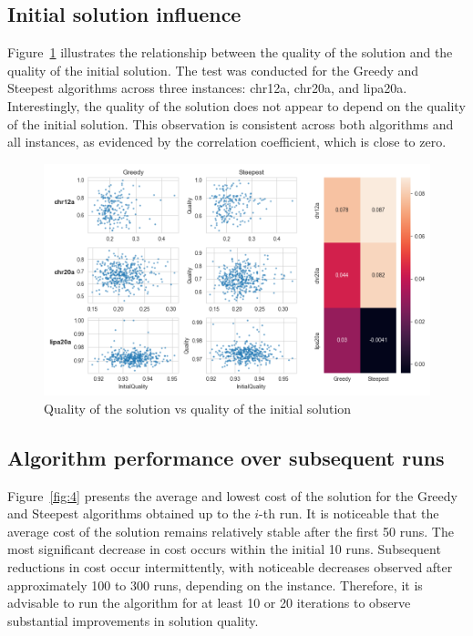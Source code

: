 \subsection{Initial solution influence}\label{subsec:initial-solution-influence2}
Figure~\ref{fig:3} illustrates the relationship between the quality of the solution and the quality of the initial solution.
The test was conducted for the Greedy and Steepest algorithms across three instances: chr12a, chr20a, and lipa20a.
Interestingly, the quality of the solution does not appear to depend on the quality of the initial solution.
This observation is consistent across both algorithms and all instances, as evidenced by the correlation coefficient, which is close to zero.


\begin{figure}[H]
    \centering
    \includegraphics[width=1.0\textwidth]{pics/initial_quality_correlation_heatmap}
    \caption{Quality of the solution vs quality of the initial solution}
    \label{fig:3}
\end{figure}

\subsection{Algorithm performance over subsequent runs}\label{subsec:algorithm-performance-over-subsequent-runs}
Figure~\ref{fig:4} presents the average and lowest cost of the solution for the Greedy and Steepest algorithms obtained up to the $i$-th run.
It is noticeable that the average cost of the solution remains relatively stable after the first 50 runs.
The most significant decrease in cost occurs within the initial 10 runs.
Subsequent reductions in cost occur intermittently, with noticeable decreases observed after approximately 100 to 300 runs, depending on the instance.
Therefore, it is advisable to run the algorithm for at least 10 or 20 iterations to observe substantial improvements in solution quality.


